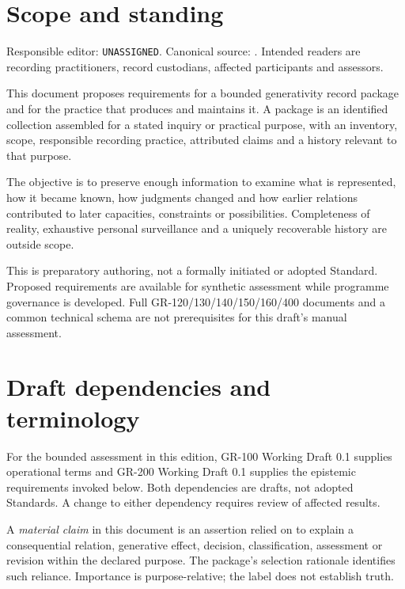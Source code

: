 \documentclass[11pt,a4paper]{article}
\begin{document}
\tableofcontents
\clearpage

\section{Scope and standing}
Responsible editor: \texttt{UNASSIGNED}. Canonical source: . Intended readers are recording practitioners, record custodians, affected participants and assessors.

This document proposes requirements for a bounded generativity record package and for the practice that produces and maintains it. A package is an identified collection assembled for a stated inquiry or practical purpose, with an inventory, scope, responsible recording practice, attributed claims and a history relevant to that purpose.

The objective is to preserve enough information to examine what is represented, how it became known, how judgments changed and how earlier relations contributed to later capacities, constraints or possibilities. Completeness of reality, exhaustive personal surveillance and a uniquely recoverable history are outside scope.

This is preparatory authoring, not a formally initiated or adopted Standard. Proposed requirements are available for synthetic assessment while programme governance is developed. Full GR-120/130/140/150/160/400 documents and a common technical schema are not prerequisites for this draft's manual assessment.

\section{Draft dependencies and terminology}
For the bounded assessment in this edition, GR-100 Working Draft 0.1 supplies operational terms and GR-200 Working Draft 0.1 supplies the epistemic requirements invoked below. Both dependencies are drafts, not adopted Standards. A change to either dependency requires review of affected results.

A \emph{material claim} in this document is an assertion relied on to explain a consequential relation, generative effect, decision, classification, assessment or revision within the declared purpose. The package's selection rationale identifies such reliance. Importance is purpose-relative; the label does not establish truth.
\end{document}
